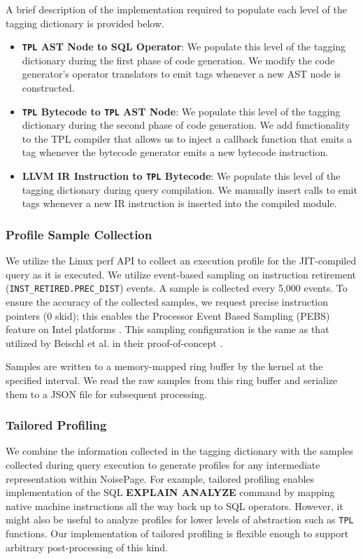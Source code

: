 \documentclass{vldb}
\newcommand{\tpl}{\texttt{TPL}\xspace}
\newcommand{\dbCode}[1]{{\sffamily\small \textbf{#1}}\xspace}
\begin{document}
A brief description of the implementation required to populate each level of the tagging dictionary is provided below.
\begin{itemize}
    \item \textbf{\tpl AST Node to SQL Operator}: We populate this level of the tagging dictionary during the first phase of code generation. We modify the code generator's operator translators to emit tags whenever a new AST node is constructed.
    \item \textbf{\tpl Bytecode to \tpl AST Node}: We populate this level of the tagging dictionary during the second phase of code generation. We add functionality to the TPL compiler that allows us to inject a callback function that emits a tag whenever the bytecode generator emits a new bytecode instruction.
    \item \textbf{LLVM IR Instruction to \tpl Bytecode}: We populate this level of the tagging dictionary during query compilation. We manually insert calls to emit tags whenever a new IR instruction is inserted into the compiled module.
\end{itemize}

\subsubsection{Profile Sample Collection}

We utilize the Linux perf API to collect an execution profile for the JIT-compiled query as it is executed. We utilize event-based sampling on instruction retirement (\lstinline{INST_RETIRED.PREC_DIST}) events. A sample is collected every 5,000 events. To ensure the accuracy of the collected samples, we request precise instruction pointers (0 skid); this enables the Processor Event Based Sampling (PEBS) feature on Intel platforms \cite{intelmanual}. This sampling configuration is the same as that utilized by Beischl et al. in their proof-of-concept \cite{beischl21}.

Samples are written to a memory-mapped ring buffer by the kernel at the specified interval. We read the raw samples from this ring buffer and serialize them to a JSON file for subsequent processing.

\subsubsection{Tailored Profiling}

We combine the information collected in the tagging dictionary with the samples collected during query execution to generate profiles for any intermediate representation within NoisePage. For example, tailored profiling enables implementation of the SQL \dbCode{EXPLAIN ANALYZE} command by mapping native machine instructions all the way back up to SQL operators. However, it might also be useful to analyze profiles for lower levels of abstraction such as \tpl functions. Our implementation of tailored profiling is flexible enough to support arbitrary post-processing of this kind.
\end{document}
